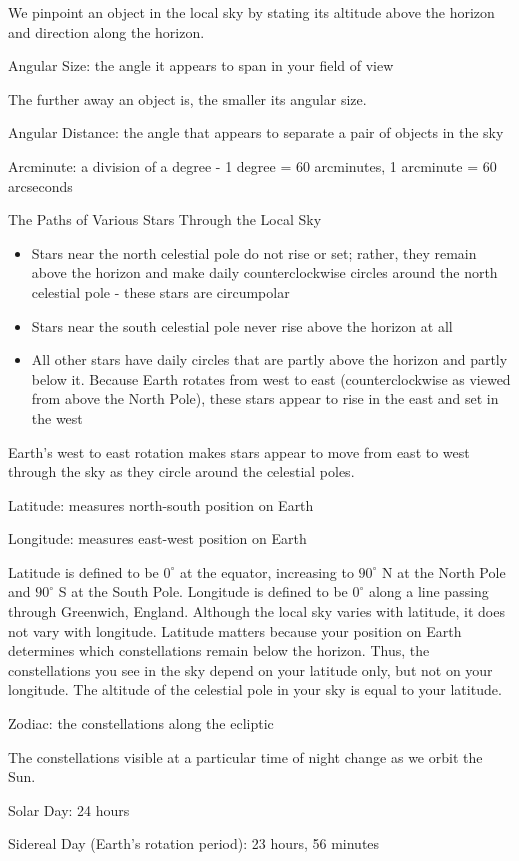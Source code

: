 \documentclass[12pt]{article}
\begin{document}
We pinpoint an object in the local sky by stating its altitude above the horizon and direction along the horizon. 
\begin{definition} Angular Size: the angle it appears to span in your field of view \end{definition}
The further away an object is, the smaller its angular size.
\begin{definition} Angular Distance: the angle that appears to separate a pair of objects in the sky \end{definition}
\begin{definition} Arcminute: a division of a degree - 1 degree = 60 arcminutes, 1 arcminute = 60 arcseconds \end{definition}
The Paths of Various Stars Through the Local Sky \begin{itemize} 
\item Stars near the north celestial pole do not rise or set; rather, they remain above the horizon and make daily counterclockwise circles around the north celestial pole - these stars are circumpolar 
\item Stars near the south celestial pole never rise above the horizon at all 
\item All other stars have daily circles that are partly above the horizon and partly below it. Because Earth rotates from west to east (counterclockwise as viewed from above the North Pole), these stars appear to rise in the east and set in the west \end{itemize} 
Earth's west to east rotation makes stars appear to move from east to west through the sky as they circle around the celestial poles. 
\begin{definition} Latitude: measures north-south position on Earth \end{definition} 
\begin{definition} Longitude: measures east-west position on Earth \end{definition} 
Latitude is defined to be $0^\circ$ at the equator, increasing to $90^\circ$ N at the North Pole and $90^\circ$ S at the South Pole. Longitude is defined to be $0^\circ$ along a line passing through Greenwich, England. Although the local sky varies with latitude, it does not vary with longitude. Latitude matters because your position on Earth determines which constellations remain below the horizon. Thus, the constellations you see in the sky depend on your latitude only, but not on your longitude. \newline 
The altitude of the celestial pole in your sky is equal to your latitude. 
\begin{definition} Zodiac: the constellations along the ecliptic \end{definition} 
The constellations visible at a particular time of night change as we orbit the Sun. 
\begin{definition} Solar Day: 24 hours \end{definition}
\begin{definition} Sidereal Day (Earth's rotation period): 23 hours, 56 minutes \end{definition} 
\end{document}
